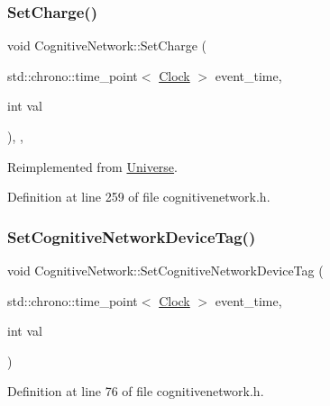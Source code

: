 \subsubsection{\texorpdfstring{Set\+Charge()}{SetCharge()}}
{\footnotesize\ttfamily void Cognitive\+Network\+::\+Set\+Charge (\begin{DoxyParamCaption}\item[{std\+::chrono\+::time\+\_\+point$<$ \hyperlink{universe_8h_a0ef8d951d1ca5ab3cfaf7ab4c7a6fd80}{Clock} $>$}]{event\+\_\+time,  }\item[{int}]{val }\end{DoxyParamCaption})\hspace{0.3cm}{\ttfamily [inline]}, {\ttfamily [final]}, {\ttfamily [virtual]}}



Reimplemented from \hyperlink{class_universe_a3b3da7c86a7b75e5e5c0b7972ac82a87}{Universe}.



Definition at line 259 of file cognitivenetwork.\+h.

\mbox{\label{class_cognitive_network_a0e8a64151a2446fc16a074ad2de325df}} 
\subsubsection{\texorpdfstring{Set\+Cognitive\+Network\+Device\+Tag()}{SetCognitiveNetworkDeviceTag()}}
{\footnotesize\ttfamily void Cognitive\+Network\+::\+Set\+Cognitive\+Network\+Device\+Tag (\begin{DoxyParamCaption}\item[{std\+::chrono\+::time\+\_\+point$<$ \hyperlink{universe_8h_a0ef8d951d1ca5ab3cfaf7ab4c7a6fd80}{Clock} $>$}]{event\+\_\+time,  }\item[{int}]{val }\end{DoxyParamCaption})\hspace{0.3cm}{\ttfamily [inline]}}



Definition at line 76 of file cognitivenetwork.\+h.

\mbox{\label{class_cognitive_network_a23c6a11d9f15a141f69a9779f174bfb3}} 

